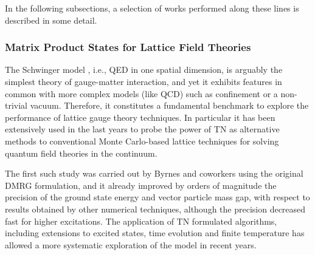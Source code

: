 \documentclass[epj,final]{svjour}
\begin{document}
In the following subsections, a selection of works performed along these lines is described in some detail.

\subsubsection{Matrix Product States for Lattice Field Theories\cite{banuls2013matrix,Banuls2013}}

The Schwinger model \cite{schwinger62,Coleman1976}, i.e., QED in one spatial dimension, is arguably the simplest theory of gauge-matter interaction, and yet it exhibits features in common with more complex models (like QCD) such as confinement or a non-trivial vacuum. Therefore, it constitutes a fundamental benchmark to explore the performance of lattice gauge theory techniques. In particular it has been extensively used in the last years to probe the power of TN  as alternative methods to conventional Monte Carlo-based lattice techniques for solving quantum field theories  in the continuum.

The first such study was carried out by Byrnes and coworkers \cite{Byrnes2002} using the original DMRG formulation, and it already improved by orders of magnitude the precision of the ground state energy and vector particle mass gap, with respect to results obtained by other numerical techniques, although the precision decreased fast for higher excitations. The application of TN formulated algorithms, including extensions to excited states, time evolution and finite temperature has allowed a more systematic exploration of the model in recent years.
\end{document}
